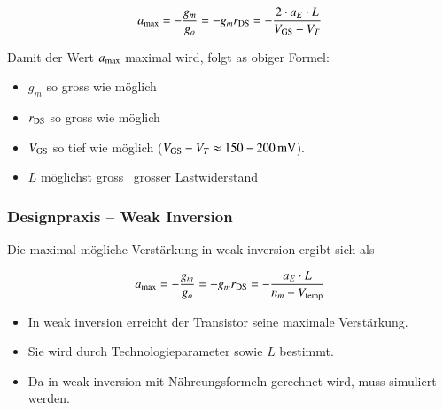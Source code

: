 \[
    a_{\rm max} = - \frac{g_m}{g_o} = -g_m r_{\rm DS} = -\frac{2\cdot a_E \cdot L}{V_{\rm GS} - V_T}
\]


Damit der Wert $a_{\rm max}$ maximal wird, folgt as obiger Formel:

\smallskip

\begin{minipage}[t]{0.35\columnwidth}
    \begin{itemize}
        \item $g_m$ so gross wie möglich
        \item $r_{\rm DS}$ so gross wie möglich
    \end{itemize}
\end{minipage}
\hfill
\begin{minipage}[t]{0.62\columnwidth}
    \begin{itemize}
        \item $V_{\rm GS}$ so tief wie möglich  ($V_{\rm GS}-V_T \approx 150 - \qty{200}{\milli\volt}$).
        \item $L$ möglichst gross \textrightarrow\ grosser Lastwiderstand
    \end{itemize}
\end{minipage}



\subsubsection{Designpraxis -- Weak Inversion}

Die \textbf{} maximal mögliche Verstärkung in weak inversion ergibt sich als

\vspace{-0.2cm}

\[
    a_{\rm max} = - \frac{g_m}{g_o} = -g_m r_{\rm DS} = -\frac{a_E \cdot L}{n_m - V_{\rm temp}}
\]


\begin{itemize}
    \item In weak inversion erreicht der Transistor seine maximale Verstärkung.
    \item Sie wird durch Technologieparameter sowie $L$ bestimmt.
    \item Da in weak inversion mit Nähreungsformeln gerechnet wird, muss simuliert werden.
\end{itemize}



